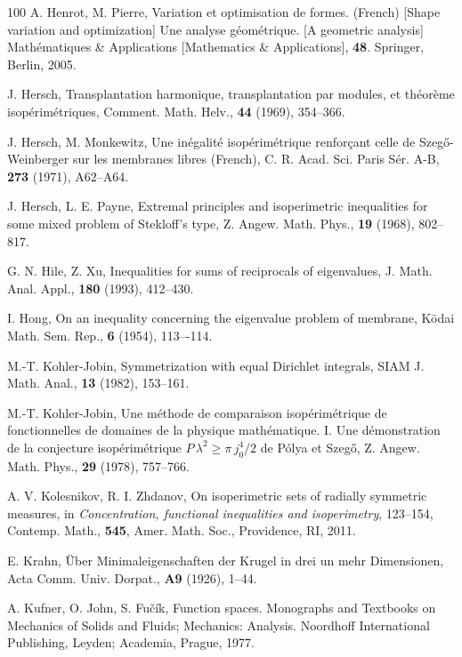 \documentclass{amsart}
\theoremstyle{definition}
\numberwithin{equation}{section}
\begin{document}
\begin{thebibliography}{100}
 A. Henrot, M. Pierre, Variation et optimisation de formes. (French) [Shape variation and optimization] Une analyse g\'eom\'etrique. [A geometric analysis] Math\'ematiques \& Applications [Mathematics \& Applications], {\bf 48}. Springer, Berlin, 2005. 

 J. Hersch, Transplantation harmonique, transplantation par modules, et th\'eor\`eme isop\'erim\'etriques, Comment. Math. Helv., {\bf 44} (1969), 354--366.

 J. Hersch, M. Monkewitz, Une in\'egalit\'e isop\'erim\'etrique renfor\c{c}ant celle de Szeg\H{o}-Weinberger sur les membranes libres (French), C. R. Acad. Sci. Paris S\'er. A-B, {\bf 273} (1971), A62--A64. 

 J. Hersch, L. E. Payne, Extremal principles and isoperimetric inequalities for some mixed problem of Stekloff's type, Z. Angew. Math. Phys., {\bf 19} (1968), 802--817.

 G. N. Hile, Z. Xu, Inequalities for sums of reciprocals of eigenvalues, J. Math. Anal. Appl., {\bf 180} (1993), 412--430.

 I. Hong, On an inequality concerning the eigenvalue problem of membrane, K\={o}dai Math. Sem. Rep., {\bf 6} (1954), 113–-114.

 M.-T. Kohler-Jobin, Symmetrization with equal Dirichlet integrals, SIAM J. Math. Anal., {\bf 13} (1982), 153--161.

 M.-T. Kohler-Jobin, Une m\'ethode de comparaison isop\'erim\'etrique de fonctionnelles de domaines de la physique math\'ematique. I. Une d\'emonstration de la conjecture isop\'erim\'etrique $P\,\lambda^2\ge \pi \, j^4_0/2$ de P\'olya et Szeg\H{o}, Z. Angew. Math. Phys., {\bf 29} (1978), 757--766. 

 A. V. Kolesnikov, R. I. Zhdanov, On isoperimetric sets of radially symmetric measures, in {\it Concentration, functional inequalities and isoperimetry}, 123--154, Contemp. Math., {\bf 545}, Amer. Math. Soc., Providence, RI, 2011. 

 E. Krahn, \"Uber Minimaleigenschaften der Krugel in drei un mehr Dimensionen, Acta Comm. Univ. Dorpat., {\bf A9} (1926), 1--44.

 A. Kufner, O. John, S. Fu\v{c}\'ik, Function spaces. Monographs and Textbooks on Mechanics of Solids and Fluids; Mechanics: Analysis. Noordhoff International Publishing, Leyden; Academia, Prague, 1977. 


\end{thebibliography}
\end{document}
